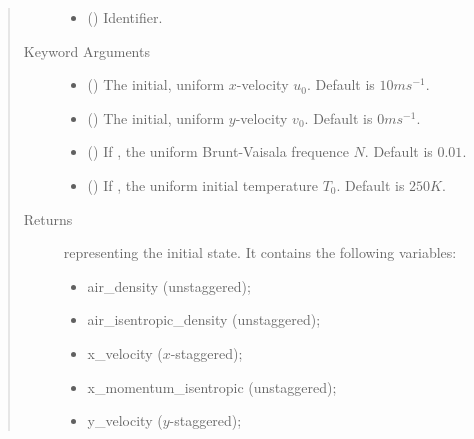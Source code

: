 \documentclass[letterpaper,10pt,english]{sphinxmanual}
\begin{document}
\begin{fulllineitems}
\begin{fulllineitems}
\begin{quote}
\begin{description}
\begin{itemize}
\item {} 
 () \textendash{} Identifier.

\end{itemize}

\item[{Keyword Arguments}] \leavevmode\begin{itemize}
\item {} 
 () \textendash{} The initial, uniform \(x\)-velocity \(u_0\). Default is \(10 m s^{-1}\).

\item {} 
 () \textendash{} The initial, uniform \(y\)-velocity \(v_0\). Default is \(0 m s^{-1}\).

\item {} 
 () \textendash{} If , the uniform Brunt-Vaisala frequence \(N\). Default is \(0.01\).

\item {} 
 () \textendash{} If , the uniform initial temperature \(T_0\). Default is \(250 K\).

\end{itemize}

\item[{Returns}] \leavevmode

{\hyperref[\detokenize{api:tasmania.storages.state_isentropic.StateIsentropic}]{}} representing the initial state.
It contains the following variables:
\begin{itemize}
\item {} 
air\_density (unstaggered);

\item {} 
air\_isentropic\_density (unstaggered);

\item {} 
x\_velocity (\(x\)-staggered);

\item {} 
x\_momentum\_isentropic (unstaggered);

\item {} 
y\_velocity (\(y\)-staggered);


\end{itemize}
\end{description}
\end{quote}
\end{fulllineitems}
\end{fulllineitems}
\end{document}

